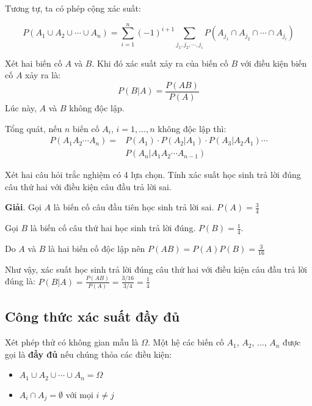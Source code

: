 Tương tự, ta có phép cộng xác suất:

\begin{theorem}
    \begin{equation*}
        P(A_1 \cup A_2 \cup \cdots \cup A_n) = \sum_{i=1}^n (-1)^{i+1} \sum_{j_1, j_2, \cdots, j_i} P(A_{j_1} \cap A_{j_2} \cap \cdots \cap A_{j_i})
    \end{equation*}
\end{theorem}

\begin{theorem}
    Xét hai biến cố $A$ và $B$. Khi đó xác suất xảy ra của biến cố $B$ với điều kiện biến cố $A$ xảy ra là: 
    \begin{equation}
        P(B | A) = \frac{P(AB)}{P(A)}
    \end{equation}
    Lúc này, $A$ và $B$ không độc lập.
\end{theorem}

Tổng quát, nếu $n$ biến cố $A_i$, $i=1, \ldots, n$ không độc lập thì:
\begin{align*}
    P(A_1 A_2 \cdots A_n) = & P(A_1) \cdot P(A_2|A_1) \cdot P(A_3 | A_2A_1) \cdots \\ & P(A_n|A_1A_2 \cdots A_{n-1})
\end{align*}

\begin{example}
    Xét hai câu hỏi trắc nghiệm có 4 lựa chọn. Tính xác suất học sinh trả lời đúng câu thứ hai với điều kiện câu đầu trả lời sai.
    
    \textbf{Giải}. Gọi $A$ là biến cố câu đầu tiên học sinh trả lời sai. $P(A) = \frac{3}{4}$
    
    Gọi $B$ là biến cố câu thứ hai học sinh trả lời đúng. $P(B) = \frac{1}{4}$.
    
    Do $A$ và $B$ là hai biến cố độc lập nên $P(AB) = P(A) P(B) = \frac{3}{16}$
    
    Như vậy, xác suất học sinh trả lời đúng câu thứ hai với điều kiện câu đầu trả lời đúng là: $P(B | A) = \frac{P(AB)}{P(A)} = \frac{3 / 16}{3 / 4} = \frac{1}{4}$
\end{example}

\subsection*{Công thức xác suất đầy đủ}

\begin{definition}
    Xét phép thử có không gian mẫu là $\Omega$. Một hệ các biến cố $A_1$, $A_2$, ..., $A_n$ được gọi là \textbf{đầy đủ} nếu chúng thỏa các điều kiện:
    \begin{itemize}
        \item $A_1 \cup A_2 \cup \cdots \cup A_n = \Omega$
        \item $A_i \cap A_j = \emptyset$ với mọi $i \neq j$
    \end{itemize}
\end{definition}
    
